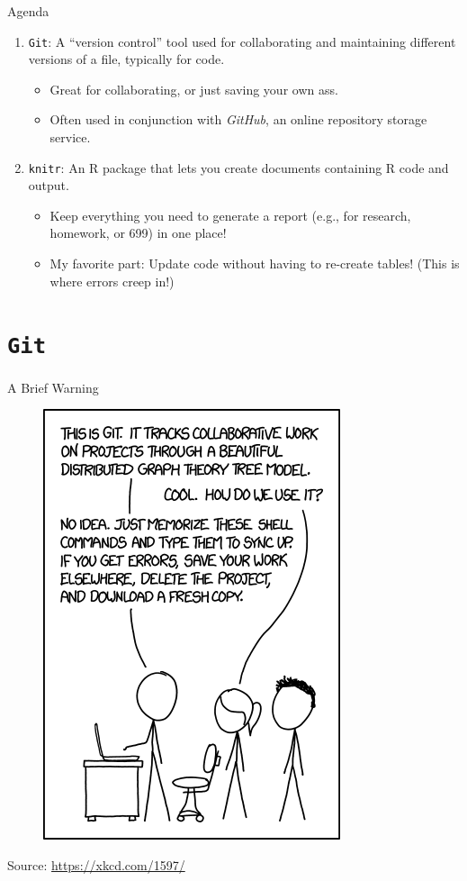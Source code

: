 \documentclass{beamer}
\begin{document}
	\begin{frame}{Agenda}
		\begin{enumerate}
			\item \texttt{Git}: A ``version control'' tool used for collaborating and maintaining different versions of a file, typically for code.
			\begin{itemize}
				\item Great for collaborating, or just saving your own ass.
				\item Often used in conjunction with \textit{GitHub}, an online repository storage service.
			\end{itemize}
			\item \texttt{knitr}: An R package that lets you create documents containing R code and output.
			\begin{itemize}
				\item Keep everything you need to generate a report (e.g., for research, homework, or 699) in one place!
				\item My favorite part: Update code without having to re-create tables! (This is where errors creep in!)
			\end{itemize}
		\end{enumerate}
	\end{frame}
	
	\section{\texttt{Git}}
	
	\begin{frame}{A Brief Warning}
		\begin{figure}
			\centering
			\includegraphics[height=.75\textheight]{xkcd-git.png}
		\end{figure}
		\scriptsize{Source: \url{https://xkcd.com/1597/}}
	\end{frame}
	
\end{document}
